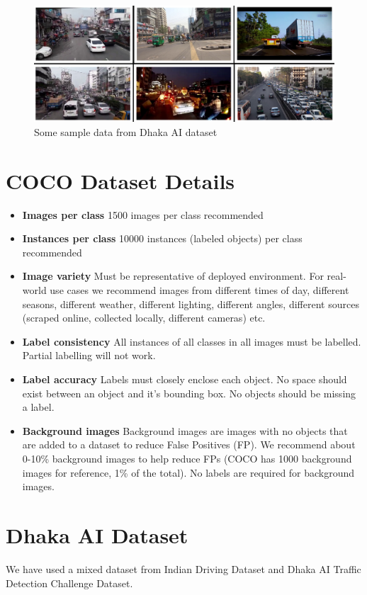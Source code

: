 \begin{figure}[ht]
    \centering
    \includegraphics[max width=\textwidth]{images/ours/dataset-collage.jpg}
   \caption[Sample data of Dhaka AI]{  Some sample data from Dhaka AI dataset }
    \label{fig:dataset_collage}
\end{figure}

\section{COCO Dataset Details}
\begin{itemize}
  \item \textbf{Images per class} 1500 images per class recommended
  \item \textbf{Instances per class} 10000 instances (labeled objects) per class recommended
  \item \textbf{Image variety} Must be representative of deployed environment. For real-world use cases we recommend images from different times of day, different seasons, different weather, different lighting, different angles, different sources (scraped online, collected locally, different cameras) etc.
 \item \textbf{Label consistency} All instances of all classes in all images must be labelled. Partial labelling will not work.
 \item \textbf{Label accuracy} Labels must closely enclose each object. No space should exist between an object and it's bounding box. No objects should be missing a label.
 \item \textbf{Background images} Background images are images with no objects that are added to a dataset to reduce False Positives (FP). We recommend about 0-10\% background images to help reduce FPs (COCO has 1000 background images for reference, 1\% of the total). No labels are required for background images.
\end{itemize}

\section{Dhaka AI Dataset}
We have used  a mixed dataset from Indian Driving Dataset and Dhaka AI Traffic Detection Challenge Dataset.

